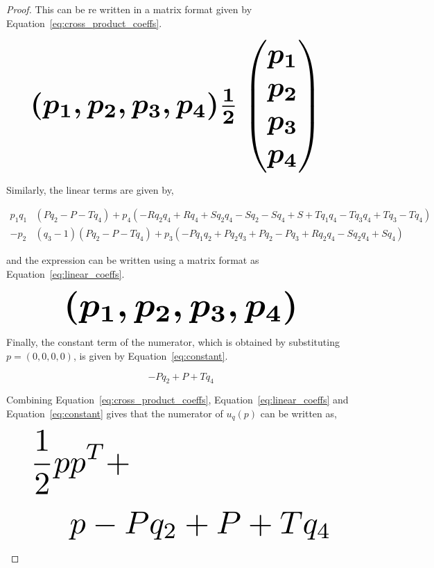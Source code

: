 \begin{proof}
This can be re written in a matrix format given by
Equation~\ref{eq:cross_product_coeffs}.

\begin{equation}\label{eq:cross_product_coeffs}
    \resizebox{0.9\linewidth}{!}{\arraycolsep=2.5pt%
    \boldmath\(
    (p_1, p_2, p_3, p_4) \frac{1}{2}  \begin{pmatrix}
    p_1 \\
    p_2 \\
    p_3 \\
    p_4 \end{pmatrix}
    \) }
\end{equation}

Similarly, the linear terms are given by,

\begingroup
\footnotesize
\begin{align*}
p_{1} q_{1} & (P q_{2} - P - T q_{4}) + p_{4} (- R q_{2} q_{4} + R q_{4} + S q_{2} q_{4} - S q_{2} - S q_{4} + S + T q_{1} q_{4} - T q_{3} q_{4} + T q_{3} - T q_{4})\\
- p_{2} & (q_{3} - 1) (P q_{2} - P - T q_{4}) + p_{3} (- P q_{1} q_{2} + P q_{2} q_{3} + P q_{2} - P q_{3} + R q_{2} q_{4} - S q_{2} q_{4} + S q_{4})
\end{align*}
\endgroup

and the expression can be written using a matrix format as
Equation~\ref{eq:linear_coeffs}.

\begin{equation}\label{eq:linear_coeffs}
    \resizebox{0.7\linewidth}{!}{\arraycolsep=2.5pt%
    \boldmath\(
    (p_1, p_2, p_3, p_4) \)}
\end{equation}

Finally, the constant term of the numerator, which is obtained by
substituting $p=(0, 0, 0, 0)$, is given by Equation~\ref{eq:constant}.

\begin{equation}\label{eq:constant}
- P q_{2} + P + T q_{4}
\end{equation}

Combining Equation~\ref{eq:cross_product_coeffs}, Equation~\ref{eq:linear_coeffs} and
Equation~\ref{eq:constant} gives that the numerator of \(u_q(p)\) can be written
as,

\begingroup
\boldmath
\begin{equation*}
\resizebox{0.9\textwidth}{!}{$ \begin{split}
    \frac{1}{2}p &  p^T +  \\
    &  p - P q_{2} + P + T q_{4}
\end{split} $}
\end{equation*}
\endgroup


\end{proof}
